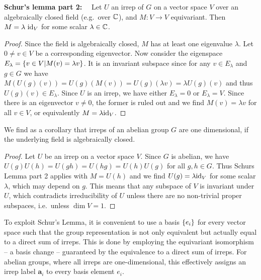 \textbf{Schur's lemma part 2:}~~
Let $U$ an irrep of $G$ on a vector space $V$ over an algebraically closed field (e.g.~over $\mathbb{C}$), and $M : V \to V$ equivariant.
%
Then $M = \lambda ~ \mathrm{id}_{V}$ for some scalar $\lambda \in\mathbb{C}$.

\begin{proof}
    Since the field is algebraically closed, $M$ has at least one eigenvalue $\lambda$.
    Let $0 \neq v \in V$ be a corresponding eigenvector. Now consider the eigenspace $E_\lambda = \setdef{v\in V}{M(v) = \lambda v}$. 
    It is an invariant subspace since for any $v\in E_\lambda$ and $g\in G$ we have
    $M( U(g)(v) ) = U(g)( M(v) ) = U(g)(\lambda v) = \lambda U(g)(v)$ and thus $U(g)(v) \in E_\lambda$.
    Since $U$ is an irrep, we have either $E_\lambda = 0$ or $E_\lambda = V$.
    Since there is an eigenvector $v \neq 0$, the former is ruled out and we find $M(v) = \lambda v$ for all $v\in V$, or equivalently $M = \lambda \mathrm{id}_{V}$.
\end{proof}

We find as a corollary that irreps of an abelian group $G$ are one dimensional, if the underlying field is algebraically closed.

\begin{proof}
    Let $U$ be an irrep on a vector space $V$.
    Since $G$ is abelian, we have $U(g) U(h) = U(gh) = U(hg) = U(h) U(g)$ for all $g, h \in G$.
    Thus Schurs Lemma part 2 applies with $M = U(h)$ and we find $U(g) = \lambda \mathrm{id}_{V}$ for some scalar $\lambda$, which may depend on $g$.
    This means that any subspace of $V$ is invariant under $U$, which contradicts irreducibility of $U$ unless there are no non-trivial proper subspaces, i.e.~unless $\dim V = 1$.
\end{proof}

To exploit Schur's Lemma, it is convenient to use a basis $\set{e_i}$ for every vector space such that the group representation is not only equivalent but actually equal to a direct sum of irreps.
%
This is done by employing the equivariant isomorphism -- a basis change -- guaranteed by the equivalence to a direct sum of irreps.
%
For abelian groups, where all irreps are one-dimensional, this effectively assigns an irrep label $\mathbf{a}_i$ to every basis element $e_i$.

